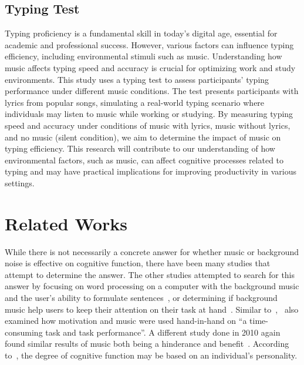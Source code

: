 \documentclass[manuscript, screen, review]{acmart} %
\begin{document}
\subsection{Typing Test}
  Typing proficiency is a fundamental skill in today's digital age, essential for academic and professional success. However, various factors can influence typing efficiency, including environmental stimuli such as music. Understanding how music affects typing speed and accuracy is crucial for optimizing work and study environments.
  This study uses a typing test to assess participants' typing performance under different music conditions. The test presents participants with lyrics from popular songs, simulating a real-world typing scenario where individuals may listen to music while working or studying.
  By measuring typing speed and accuracy under conditions of music with lyrics, music without lyrics, and no music (silent condition), we aim to determine the impact of music on typing efficiency. This research will contribute to our understanding of how environmental factors, such as music, can affect cognitive processes related to typing and may have practical implications for improving productivity in various settings.


\section{Related Works}
While there is not necessarily a concrete answer for whether music or background noise is effective on cognitive function, there have been many
studies that attempt to determine the answer. The other studies attempted to search for this answer by
focusing on word processing on a computer with the background music and the user's ability to formulate sentences~\cite{ransdell2001141}, 
or determining if background music help users to keep their attention on their task at hand~\cite{kiss2021effect}. Similar to~\cite{kiss2021effect},~\cite{mathew2022inherently} also examined how motivation and music were used hand-in-hand on ``a time-consuming task and task performance''. A different study done in 2010 again found similar results of music both being a hinderance and benefit~\cite{AudioDistractionsAshley}. According to~\cite{Gonzalez_Aiello_2019}, the degree of cognitive function may be based on an individual's personality.
\end{document}
